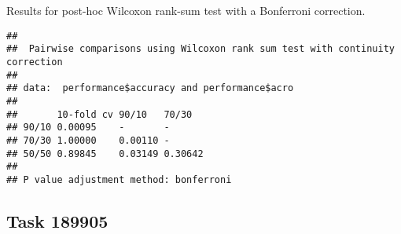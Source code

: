 \documentclass[
]{book}
\newenvironment{Shaded}{\begin{snugshade}}{\end{snugshade}}
\newcommand{\AttributeTok}[1]{\textcolor[rgb]{0.13,0.29,0.53}{#1}}
\newcommand{\ConstantTok}[1]{\textcolor[rgb]{0.56,0.35,0.01}{#1}}
\newcommand{\FunctionTok}[1]{\textcolor[rgb]{0.13,0.29,0.53}{\textbf{#1}}}
\newcommand{\NormalTok}[1]{#1}
\newcommand{\SpecialCharTok}[1]{\textcolor[rgb]{0.81,0.36,0.00}{\textbf{#1}}}
\newcommand{\StringTok}[1]{\textcolor[rgb]{0.31,0.60,0.02}{#1}}
\begin{document}
Results for post-hoc Wilcoxon rank-sum test with a Bonferroni correction.

\begin{Shaded}
\end{Shaded}

\begin{verbatim}
## 
##  Pairwise comparisons using Wilcoxon rank sum test with continuity correction 
## 
## data:  performance$accuracy and performance$acro 
## 
##       10-fold cv 90/10   70/30  
## 90/10 0.00095    -       -      
## 70/30 1.00000    0.00110 -      
## 50/50 0.89845    0.03149 0.30642
## 
## P value adjustment method: bonferroni
\end{verbatim}

\hypertarget{task-189905}{%
\subsection{Task 189905}\label{task-189905}}
\end{document}

